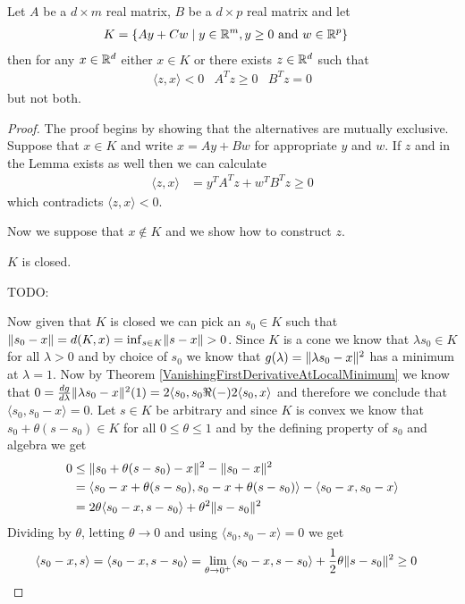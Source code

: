 \begin{lem}\label{FarkasLemma}Let $A$ be a $d \times m$ real matrix, $B$ be a $d \times p$ real matrix and let 
\begin{align*}
K &= \lbrace A y + C w \mid y \in \mathbb{R}^m, y \geq 0 \text{ and } w \in \mathbb{R}^p \rbrace
\end{align*}
then for any $x \in \mathbb{R}^d$ either $x \in K$ or there exists $z \in \mathbb{R}^d$ such that 
\begin{align*}
\langle z, x \rangle < 0 & A^T z \geq 0 & B^T z = 0
\end{align*}
but not both.
\end{lem}
\begin{proof}
The proof begins by showing that the alternatives are mutually exclusive.  Suppose that $x \in K$ and write 
$x = A y + B w$ for appropriate $y$ and $w$.  If $z$ and in the Lemma exists as well then we can calculate
\begin{align*}
\langle z, x \rangle &= y^T A^T z + w^T B^T z \geq 0
\end{align*}
which contradicts $\langle z,x \rangle < 0$.

Now we suppose that $x \notin K$ and we show how to construct $z$.  

\begin{clm} $K$ is closed.
\end{clm}
TODO:

Now given that $K$ is closed we can pick an $s_0 \in K$ such that $\lVert s_0 - x \rVert = d(K, x) = \inf_{s \in K} \lVert s - x \rVert> 0$.  
Since $K$ is a cone we know that $\lambda s_0 \in K$ for all $\lambda > 0$ and by choice of $s_0$ we know that 
$g(\lambda) = \lVert \lambda s_0 - x \rVert^2$ has a minimum at $\lambda = 1$.  Now by Theorem \ref{VanishingFirstDerivativeAtLocalMinimum}
we know that $0 = \frac{dg}{d\lambda} \lVert \lambda s_0 - x \rVert^2(1) = 2 \langle s_0,  s_0 \Re(-) 2 \langle s_0, x \rangle$ and therefore
we conclude that $\langle s_0, s_0 - x \rangle = 0$.  Let $s \in K$ be arbitrary and since $K$ is convex we know that $s_0 + \theta (s - s_0) \in K$ for
all $0 \leq \theta \leq 1$ and by the defining property of $s_0$ and algebra we get
\begin{align*}
0 &\leq \lVert s_0 + \theta (s - s_0) -x  \rVert^2 - \lVert s_0 -x  \rVert^2  \\
&=\langle s_0 - x + \theta (s - s_0), s_0 - x + \theta (s - s_0) \rangle - \langle s_0 -x, s_0 -x \rangle \\
&=2 \theta \langle s_0 - x, s - s_0 \rangle + \theta^2 \lVert s - s_0 \rVert^2
\end{align*}
Dividing by $\theta$,  letting $\theta \to 0$ and using $\langle s_0, s_0 - x \rangle = 0$ we get 
\begin{align*}
\langle s_0 - x, s \rangle &= \langle s_0 - x, s - s_0 \rangle = \lim_{\theta \to 0^+}  \langle s_0 - x, s - s_0 \rangle + \frac{1}{2}\theta \lVert s - s_0 \rVert^2 \geq 0
\end{align*}


\end{proof}
